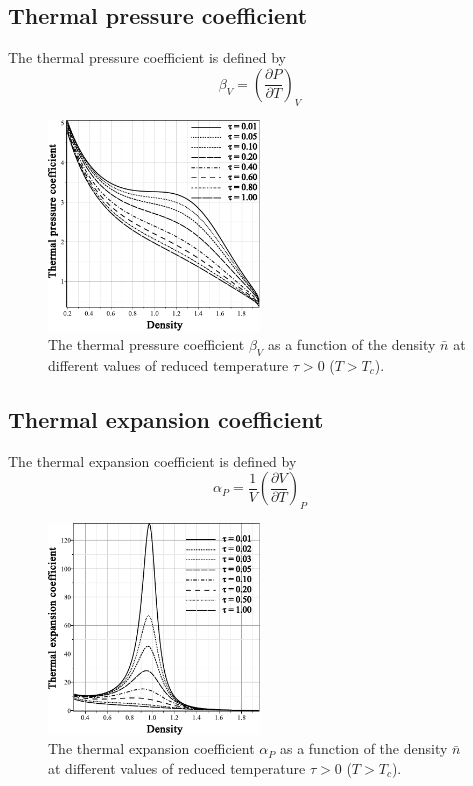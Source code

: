 \documentclass[12pt]{article}
\begin{document}
	\subsection{Thermal pressure coefficient}
	The thermal pressure coefficient is defined by
	\begin{equation}
		\label{def:therm_pres_coef}
		\beta_V = \left( \frac{\partial P}{\partial T} \right)_V
	\end{equation}
	
	\begin{figure}[h!]
		\centering \includegraphics[width=0.5\textwidth]{f3.pdf}
		\vskip-3mm\caption{The thermal pressure coefficient $\beta_V$ as a function of the density $\bar n$ at different values of reduced temperature $\tau > 0$ ($T > T_c$). 
		}\label{fig3}
	\end{figure}
	
	\subsection{Thermal expansion coefficient}
	The thermal expansion coefficient is defined by
	\begin{equation}
		\alpha_P = \frac{1}{V}\left(\frac{\partial V}{\partial T}\right)_P
	\end{equation}
	
	\begin{figure}[h!]
		\centering \includegraphics[width=0.5\textwidth]{f4.pdf}
		\vskip-3mm\caption{The thermal expansion coefficient $\alpha_P$ as a function of the density $\bar n$ at different values of reduced temperature $\tau > 0$ ($T > T_c$). 
		}\label{fig4}
	\end{figure}
	
\end{document}

